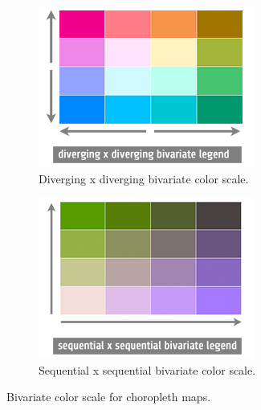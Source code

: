 \begin{figure}[!htb]
  \captionsetup[subfigure]{justification=centering}
  \centering
  \begin{subfigure}[b]{0.4\textwidth}
    \includegraphics[width=\textwidth]{images/choropleth/divxdiv.png}
    \caption{Diverging x diverging bivariate color scale.}
    \label{fig:bi-div}
  \end{subfigure}
  \hfill
  \begin{subfigure}[b]{0.4\textwidth}
    \includegraphics[width=\textwidth]{images/choropleth/seqxseq.png}
    \caption{Sequential x sequential bivariate color scale.}
    \label{fig:bi-seq}
  \end{subfigure}
  \caption[
    Bivariate color scale for choropleth maps, Urldate: 07.2016 \newline
    \small\texttt{\url{https://axismaps.github.io/thematic-cartography/images/seqxseq.png}} \newline
    \small\texttt{\url{https://axismaps.github.io/thematic-cartography/images/divxdiv.png}}
  ]{
    Bivariate color scale for choropleth maps.
  }
  \label{fig:bi-scale}
\end{figure}
